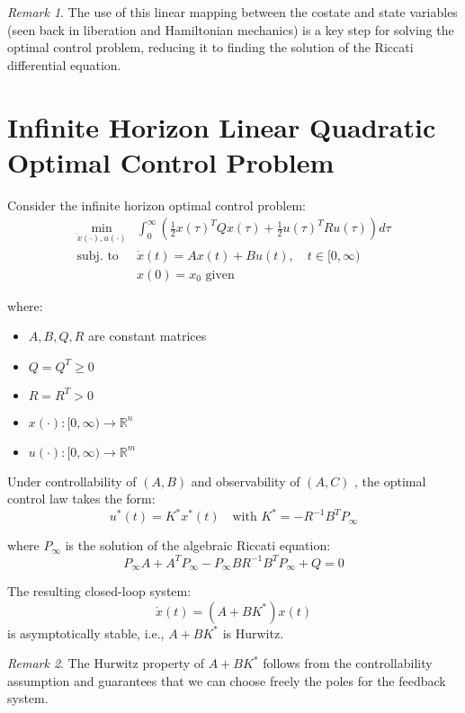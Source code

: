 \documentclass[openany]{book}
\theoremstyle{definition}
\theoremstyle{remark}
\newtheorem*{remark}{Remark}
\begin{document}
\begin{remark}
The use of this linear mapping between the costate and state variables (seen back in liberation and Hamiltonian mechanics) is a key step for solving the optimal control problem, reducing it to finding the solution of the Riccati differential equation.
\end{remark}

\section{Infinite Horizon Linear Quadratic Optimal Control Problem}

Consider the infinite horizon optimal control problem:
\begin{align*}
    \min_{x(\cdot),u(\cdot)} & \int_0^{\infty} \left(\frac{1}{2}x(\tau)^TQx(\tau) + \frac{1}{2}u(\tau)^TRu(\tau)\right)d\tau\\
    \text{subj. to } & \dot{x}(t) = Ax(t) + Bu(t), \quad t \in [0,\infty)\\
    & x(0) = x_0 \text{ given}
\end{align*}

where:
\begin{itemize}
    \item $A,B,Q,R$ are constant matrices
    \item $Q = Q^T \geq 0$
    \item $R = R^T > 0$
    \item $x(\cdot):[0,\infty) \to \mathbb{R}^n$
    \item $u(\cdot):[0,\infty) \to \mathbb{R}^m$
\end{itemize}

Under controllability of $(A,B)$ and observability of $(A,C)$ , the optimal control law takes the form:
\[
    u^*(t) = K^*x^*(t) \quad \text{with } K^* = -R^{-1}B^TP_\infty
\]

where $P_\infty$ is the solution of the algebraic Riccati equation:
\[
    P_\infty A + A^TP_\infty - P_\infty BR^{-1}B^TP_\infty + Q = 0
\]

The resulting closed-loop system:
\[
    \dot{x}(t) = (A + BK^*)x(t)
\]
is asymptotically stable, i.e., $A + BK^*$ is Hurwitz.

\begin{remark}
The Hurwitz property of $A + BK^*$ follows from the controllability assumption and guarantees that we can choose freely the poles for the feedback system.
\end{remark}
\end{document}
